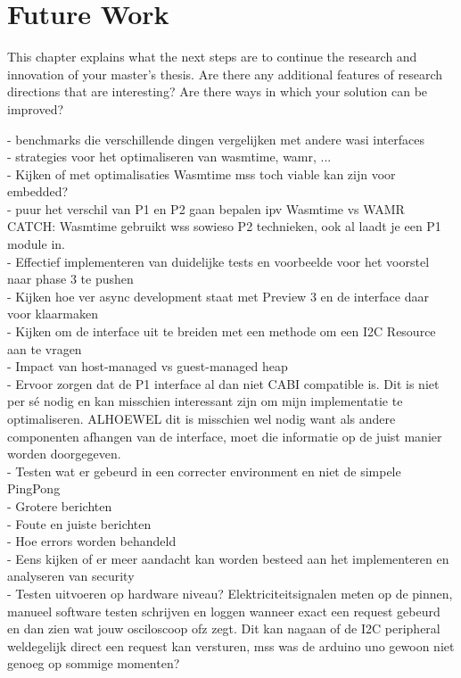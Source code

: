 \chapter*{Future Work}

This chapter explains what the next steps are to continue the research and innovation of your master's thesis. Are there any additional features of research directions that are interesting? Are there ways in which your solution can be improved?


- benchmarks die verschillende dingen vergelijken met andere wasi interfaces \\
- strategies voor het optimaliseren van wasmtime, wamr, ... \\
- Kijken of met optimalisaties Wasmtime mss toch viable kan zijn voor embedded? \\
- puur het verschil van P1 en P2 gaan bepalen ipv Wasmtime vs WAMR CATCH: Wasmtime gebruikt wss sowieso P2 technieken, ook al laadt je een P1 module in. \\
- Effectief implementeren van duidelijke tests en voorbeelde voor het voorstel naar phase 3 te pushen \\
- Kijken hoe ver async development staat met Preview 3 en de interface daar voor klaarmaken \\
- Kijken om de interface uit te breiden met een methode om een I2C Resource aan te vragen \\
- Impact van host-managed vs guest-managed heap \\
- Ervoor zorgen dat de P1 interface al dan niet CABI compatible is. Dit is niet per sé nodig en kan misschien interessant zijn om mijn implementatie te optimaliseren. ALHOEWEL dit is misschien wel nodig want als andere componenten afhangen van de interface, moet die informatie op de juist manier worden doorgegeven. \\
- Testen wat er gebeurd in een correcter environment en niet de simpele PingPong \\
    - Grotere berichten \\
    - Foute en juiste berichten \\
    - Hoe errors worden behandeld \\
- Eens kijken of er meer aandacht kan worden besteed aan het implementeren en analyseren van security \\
- Testen uitvoeren op hardware niveau? Elektriciteitsignalen meten op de pinnen, manueel software testen schrijven en loggen wanneer exact een request gebeurd en dan zien wat jouw osciloscoop ofz zegt. Dit kan nagaan of de I2C peripheral weldegelijk direct een request kan versturen, mss was de arduino uno gewoon niet genoeg op sommige momenten?